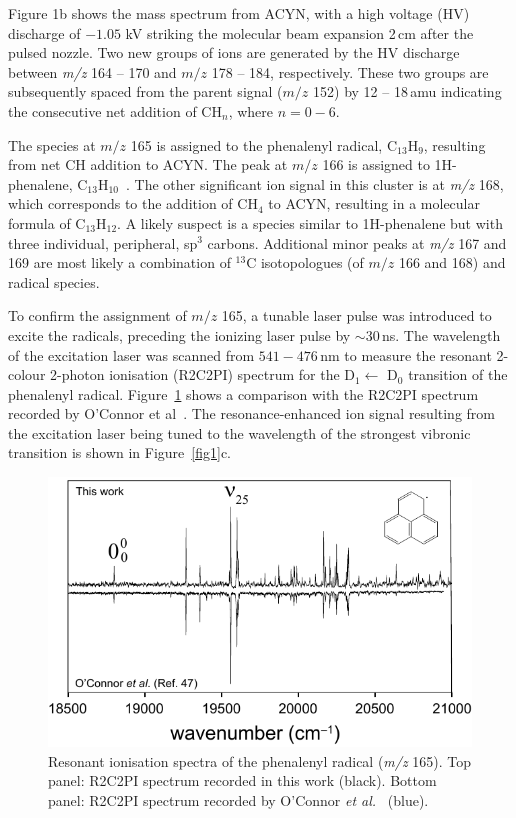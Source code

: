 \documentclass[journal=jacsat,manuscript=article,layout=onecolumn]{achemso}
\begin{document}
Figure 1b shows the mass spectrum from ACYN, with a high voltage (HV) discharge of $-1.05$ kV striking the molecular beam expansion 2\,cm after the pulsed nozzle. Two new groups of ions are generated by the HV discharge between \textit{m/z} 164 – 170 and $m/z$ 178 – 184, respectively. These two groups are subsequently spaced from the parent signal ($m/z$ 152) by 12 – 18\,amu indicating the consecutive net addition of CH$_n$, where $n=0-6$.

The species at $m/z$ 165 is assigned to the phenalenyl radical, C$_{13}$H$_9$, resulting from net CH addition to ACYN. The peak at $m/z$ 166 is assigned to 1H-phenalene, C$_{13}$H$_{10}$~\cite{oco17}. The other significant ion signal in this cluster is at \textit{m/z} 168, which corresponds to the addition of CH$_4$ to ACYN, resulting in a molecular formula of C$_{13}$H$_{12}$. A likely suspect is a species similar to 1H-phenalene but with three individual, peripheral, sp$^3$ carbons. Additional minor peaks at \textit{m/z} 167 and 169 are most likely a combination of $^{13}$C isotopologues (of $m/z$ 166 and 168) and radical species.

To confirm the assignment of $m/z$ 165, a tunable laser pulse was introduced to excite the radicals, preceding the ionizing laser pulse by $\sim$30\,ns. The wavelength of the excitation laser was scanned from $541-476$\,nm to measure the resonant 2-colour 2-photon ionisation (R2C2PI) spectrum for the D$_1 \leftarrow$ D$_0$ transition of the phenalenyl radical. Figure~\ref{fig2} shows a comparison with the R2C2PI spectrum recorded by O’Connor et al~\cite{oco11}. The resonance-enhanced ion signal resulting from the excitation laser being tuned to the wavelength of the strongest vibronic transition is shown in Figure~\ref{fig1}c.

\begin{figure} [h!]
	\includegraphics[width=15cm]{Figures/Figure2}
	\caption{Resonant ionisation spectra of the phenalenyl radical (\textit{m/z} 165). Top panel: R2C2PI spectrum recorded in this work (black). Bottom panel: R2C2PI spectrum recorded by O'Connor \textit{et al.}~\cite{oco11} (blue).}
	\label{fig2}
\end{figure}
\end{document}
